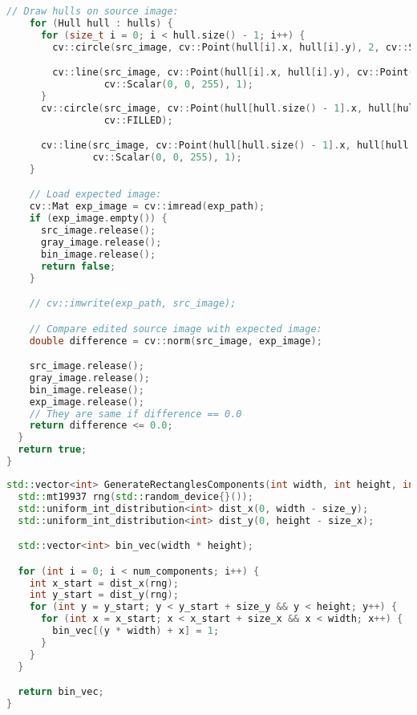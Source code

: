 \documentclass[12pt]{article}
\begin{document}
\begin{lstlisting}[language=C++, caption={Функция ImageRunTest() проверки корректности с помощью OpenCV}]
    // Draw hulls on source image:
    for (Hull hull : hulls) {
      for (size_t i = 0; i < hull.size() - 1; i++) {
        cv::circle(src_image, cv::Point(hull[i].x, hull[i].y), 2, cv::Scalar(0, 0, 255), cv::FILLED);

        cv::line(src_image, cv::Point(hull[i].x, hull[i].y), cv::Point(hull[i + 1].x, hull[i + 1].y),
                 cv::Scalar(0, 0, 255), 1);
      }
      cv::circle(src_image, cv::Point(hull[hull.size() - 1].x, hull[hull.size() - 1].y), 2, cv::Scalar(0, 0, 255),
                 cv::FILLED);

      cv::line(src_image, cv::Point(hull[hull.size() - 1].x, hull[hull.size() - 1].y), cv::Point(hull[0].x, hull[0].y),
               cv::Scalar(0, 0, 255), 1);
    }

    // Load expected image:
    cv::Mat exp_image = cv::imread(exp_path);
    if (exp_image.empty()) {
      src_image.release();
      gray_image.release();
      bin_image.release();
      return false;
    }

    // cv::imwrite(exp_path, src_image);

    // Compare edited source image with expected image:
    double difference = cv::norm(src_image, exp_image);

    src_image.release();
    gray_image.release();
    bin_image.release();
    exp_image.release();
    // They are same if difference == 0.0
    return difference <= 0.0;
  }
  return true;
}
\end{lstlisting}

\label{appendix:generate_rectangles_components}
\begin{lstlisting}[language=C++, caption={Функция GenerateRectanglesComponents() генерации массива пикселей}]
std::vector<int> GenerateRectanglesComponents(int width, int height, int num_components, int size_y, int size_x) {
  std::mt19937 rng(std::random_device{}());
  std::uniform_int_distribution<int> dist_x(0, width - size_y);
  std::uniform_int_distribution<int> dist_y(0, height - size_x);

  std::vector<int> bin_vec(width * height);

  for (int i = 0; i < num_components; i++) {
    int x_start = dist_x(rng);
    int y_start = dist_y(rng);
    for (int y = y_start; y < y_start + size_y && y < height; y++) {
      for (int x = x_start; x < x_start + size_x && x < width; x++) {
        bin_vec[(y * width) + x] = 1;
      }
    }
  }

  return bin_vec;
}
\end{lstlisting}
\end{document}
